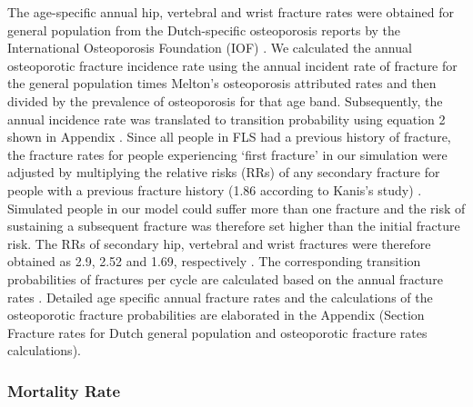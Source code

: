 The age-specific annual hip, vertebral and wrist fracture rates were obtained for general population from the Dutch-specific osteoporosis reports by the International Osteoporosis Foundation (IOF) \cite{4-47}. We calculated the annual osteoporotic fracture incidence rate using the annual incident rate of fracture for the general population times Melton's osteoporosis attributed rates \cite{4-48} and then divided by the prevalence of osteoporosis for that age band. Subsequently, the annual incidence rate was translated to transition probability using equation 2 shown in Appendix \cite{4-46}. Since all people in FLS had a previous history of fracture, the fracture rates for people experiencing `first fracture' in our simulation were adjusted by multiplying the relative risks (RRs) of any secondary fracture for people with a previous fracture history (1.86 according to Kanis's study) \cite{4-49}. Simulated people in our model could suffer more than one fracture and the risk of sustaining a subsequent fracture was therefore set higher than the initial fracture risk. The RRs of secondary hip, vertebral and wrist fractures were therefore obtained as 2.9, 2.52 and 1.69, respectively \cite{4-50,4-51}. The corresponding transition probabilities of fractures per cycle are calculated based on the annual fracture rates \cite{4-46}. Detailed age specific annual fracture rates and the calculations of the osteoporotic fracture probabilities are elaborated in the Appendix (Section Fracture rates for Dutch general population and osteoporotic fracture rates calculations).

\subsubsection{Mortality Rate}

